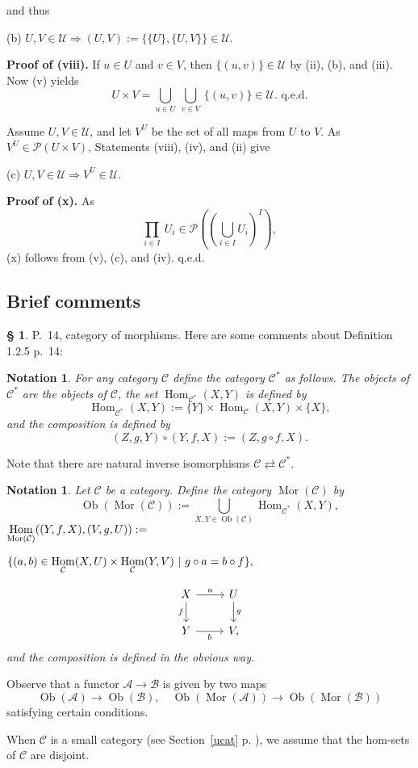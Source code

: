 \documentclass[12pt]{article}%
\newtheorem{nota}[thm]{Notation}
\theoremstyle{remark}
\theoremstyle{definition}
\newtheorem{s}[thm]{\S}%
\newcommand{\nn}{\noindent}
\newcommand{\A}{\mathcal A}
\newcommand{\B}{\mathcal B}
\newcommand{\C}{\mathcal C}
\newcommand{\then}{\Rightarrow}
\DeclareMathOperator{\Hom}{Hom}%
\DeclareMathOperator{\Mor}{Mor}
\DeclareMathOperator{\Ob}{Ob}
\begin{document}
\nn and thus

(b) $U,V\in\mathcal U\then(U,V):=\{\{U\},\{U,V\}\}\in\mathcal U$.

\nn\textbf{Proof of (viii).} If $u\in U$ and $v\in V$, then $\{(u,v)\}\in\mathcal U$ by (ii), (b), and (iii). Now (v) yields 
$$
U\times V=\bigcup_{u\in U}\ \bigcup_{v\in V}\ \{(u,v)\}\in\mathcal U.\text{ q.e.d.} 
$$ 

Assume $U,V\in\mathcal U$, and let $V^U$ be the set of all maps from $U$ to $V$. As $V^U\in\mathcal P(U\times V)$, Statements (viii), (iv), and (ii) give

(c) $U,V\in\mathcal U\then V^U\in\mathcal U$.

\nn\textbf{Proof of (x).} As 
$$
\prod_{i\in I}\ U_i\in\mathcal P\left(\left(\bigcup_{i\in I}U_i\right)^I\right),
$$
(x) follows from (v), (c), and (iv). q.e.d.


\subsection{Brief comments}

\begin{s}\label{d125}
P.~14, category of morphisms. Here are some comments about Definition 1.2.5 p.~14:

\begin{nota}\label{c*}
For any category $\C$ define the category $\C^*$\index{$\C^*$} as follows. The objects of $\C^*$ are the objects of $\C$, the set $\Hom_{\C^*}(X,Y)$ is defined by 
$$
\Hom_{\C^*}(X,Y):=\{Y\}\times\Hom_{\C}(X,Y)\times\{X\},
$$
and the composition is defined by 
$$
(Z,g,Y)\circ(Y,f,X):=(Z,g\circ f,X).
$$ 
\end{nota}

Note that there are natural inverse isomorphisms $\C\rightleftarrows\C^*$. 

\begin{nota}\label{mor}
%
Let $\C$ be a category. Define the category $\Mor(\C)$ \index{$\Mor$} by 
$$
\Ob(\Mor(\C)):=\bigcup_{X,Y\in\Ob(\C)}\Hom_{\C^*}(X,Y),
$$
$\ds\Hom_{\Mor(\C)}((Y,f,X),(V,g,U)):=$\bigskip 

$\hfill\ds\{(a,b)\in\Hom_\C(X,U)\times\Hom_\C(Y,V)\ | \ g\circ a=b\circ f\},$\bigskip

\nn{\em i.e.} 
$$
\begin{tikzcd}
X\ar{d}[swap]{f}\ar{r}{a}&U\ar{d}{g}\\ 
Y\ar{r}[swap]{b}&V,
\end{tikzcd}
$$ 
and the composition is defined in the obvious way.
\end{nota}

Observe that a functor $\A\to\B$ is given by two maps 
$$
\Ob(\A)\to\Ob(\B),\quad\Ob(\Mor(\A))\to\Ob(\Mor(\B))
$$ 
satisfying certain conditions.

When $\C$ is a small category (see Section~\ref{ucat} p. \pageref{ucat}), we assume that the hom-sets of $\C$ are disjoint.
\end{s}
\end{document}
